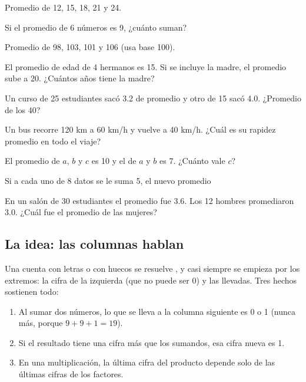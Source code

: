 \taller
{}
\begin{ejercicios}
\item Promedio de 12, 15, 18, 21 y 24. 
\item Si el promedio de 6 números es 9, ¿cuánto suman? 
\item Promedio de 98, 103, 101 y 106 (usa base 100). 
\end{ejercicios}
\begin{ejercicios}
\item El promedio de edad de 4 hermanos es 15. Si se incluye la madre, el promedio sube a 20. ¿Cuántos años tiene la madre? 
\item Un curso de 25 estudiantes sacó 3.2 de promedio y otro de 15 sacó 4.0. ¿Promedio de los 40? 
\item Un bus recorre 120 km a 60 km/h y vuelve a 40 km/h. ¿Cuál es su rapidez promedio en todo el viaje? 
\end{ejercicios}
\begin{ejercicios}
\item El promedio de $a$, $b$ y $c$ es 10 y el de $a$ y $b$ es 7. ¿Cuánto vale $c$?
\item Si a cada uno de 8 datos se le suma 5, el nuevo promedio
\item En un salón de 30 estudiantes el promedio fue 3.6. Los 12 hombres promediaron 3.0. ¿Cuál fue el promedio de las mujeres?
\end{ejercicios}

\bitacora


\subsection{La idea: las columnas hablan}
Una cuenta con letras o con huecos se resuelve , y casi siempre se empieza por los extremos:
la cifra de la izquierda (que no puede ser 0) y las llevadas. Tres hechos sostienen todo:
\begin{enumerate}
  \item Al sumar dos números, lo que se lleva a la columna siguiente es 0 o 1 (nunca más, porque $9 + 9 + 1 = 19$).
  \item Si el resultado tiene una cifra más que los sumandos, esa cifra nueva es 1.
  \item En una multiplicación, la última cifra del producto depende solo de las últimas cifras de los factores.
\end{enumerate}

